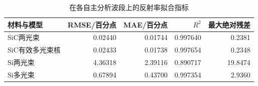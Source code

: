 \begin{table}[htbp]\centering
\caption{在各自主分析波段上的反射率拟合指标}\label{tab:metrics}
\begin{tabular}{lrrrr}
\toprule
材料与模型 & RMSE/百分点 & MAE/百分点 & $R^2$ & 最大绝对残差\\\midrule
SiC两光束 & 0.02440 & 0.01744 & 0.997640 & 0.2381\\
SiC有效多光束核 & 0.02433 & 0.01738 & 0.997654 & 0.2348\\
Si两光束 & 4.36318 & 2.39116 & 0.890717 & 19.8474\\
Si多光束 & 0.67894 & 0.43700 & 0.997354 & 2.9360\\
\bottomrule
\end{tabular}\end{table}
